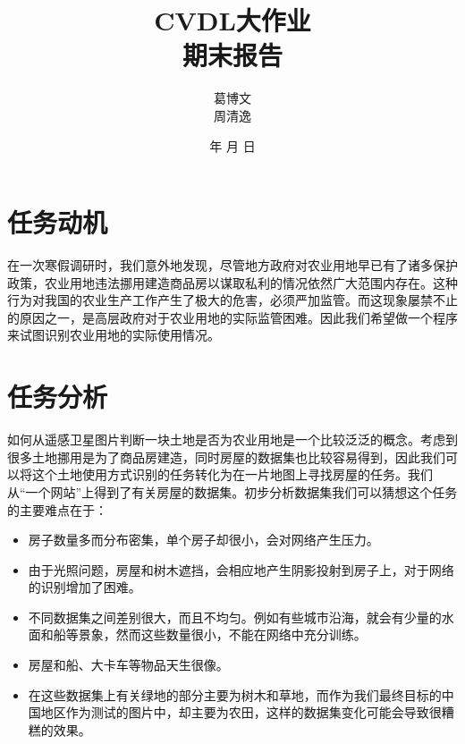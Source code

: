 \documentclass[a4paper,12pt]{article}
\renewcommand{\today}{\number\year 年 \number\month 月 \number\day 日}
\begin{document}
\begin{CJK*}{UTF8}{gbsn}

\title{\textbf{CVDL大作业\\期末报告}}
\author{葛博文\\周清逸}
\date{\today}
\maketitle

\begin{spacing}{1.2}
    \section{任务动机}
    在一次寒假调研时，我们意外地发现，尽管地方政府对农业用地早已有了诸多保护政策，农业用地违法挪用建造商品房以谋取私利的情况依然广大范围内存在。这种行为对我国的农业生产工作产生了极大的危害，必须严加监管。而这现象屡禁不止的原因之一，是高层政府对于农业用地的实际监管困难。因此我们希望做一个程序来试图识别农业用地的实际使用情况。
    \section{任务分析}
    如何从遥感卫星图片判断一块土地是否为农业用地是一个比较泛泛的概念。考虑到很多土地挪用是为了商品房建造，同时房屋的数据集也比较容易得到，因此我们可以将这个土地使用方式识别的任务转化为在一片地图上寻找房屋的任务。我们从“一个网站”上得到了有关房屋的数据集。初步分析数据集我们可以猜想这个任务的主要难点在于：
    \begin{itemize}
        \item 房子数量多而分布密集，单个房子却很小，会对网络产生压力。
        \item 由于光照问题，房屋和树木遮挡，会相应地产生阴影投射到房子上，对于网络的识别增加了困难。
        \item 不同数据集之间差别很大，而且不均匀。例如有些城市沿海，就会有少量的水面和船等景象，然而这些数量很小，不能在网络中充分训练。
        \item 房屋和船、大卡车等物品天生很像。
        \item 在这些数据集上有关绿地的部分主要为树木和草地，而作为我们最终目标的中国地区作为测试的图片中，却主要为农田，这样的数据集变化可能会导致很糟糕的效果。
    \end{itemize}
\end{spacing}
\end{CJK*}
\end{document}
